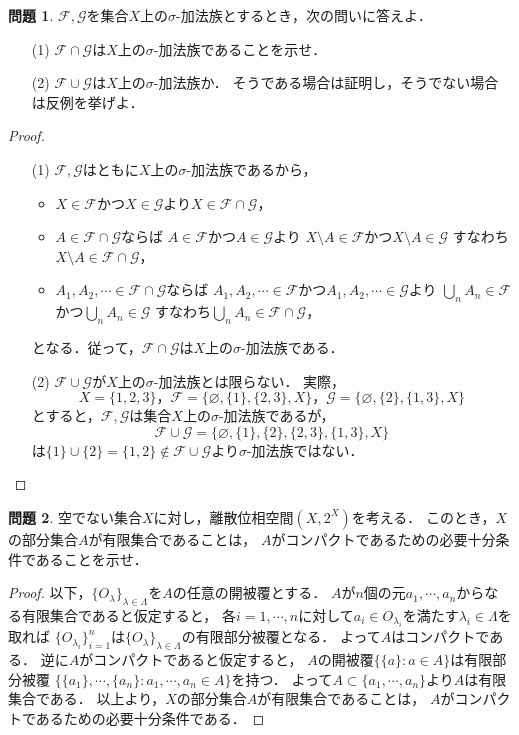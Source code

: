 \documentclass{jsarticle}
\theoremstyle{definition}
\newtheorem{qst}{問題}
\begin{document}
\begin{qst}
$\mathcal{F},\mathcal{G}$を集合$X$上の$\sigma$-加法族とするとき，次の問いに答えよ．
\begin{itemize}
\item[(1)]$\mathcal{F}\cap\mathcal{G}$は$X$上の$\sigma$-加法族であることを示せ．
\item[(2)]$\mathcal{F}\cup\mathcal{G}$は$X$上の$\sigma$-加法族か．
そうである場合は証明し，そうでない場合は反例を挙げよ．
\end{itemize}
\end{qst}
\begin{proof}
\begin{itemize}
\item[(1)]
$\mathcal{F},\mathcal{G}$はともに$X$上の$\sigma$-加法族であるから，
\begin{itemize}
\item$X\in\mathcal{F}$かつ$X\in\mathcal{G}$より$X\in\mathcal{F}\cap\mathcal{G}$，
\item$A\in\mathcal{F}\cap\mathcal{G}$ならば
$A\in\mathcal{F}$かつ$A\in\mathcal{G}$より
$X\setminus A\in\mathcal{F}$かつ$X\setminus A\in\mathcal{G}$
すなわち$X\setminus A\in\mathcal{F}\cap\mathcal{G}$，
\item$A_1,A_2,\cdots\in\mathcal{F}\cap\mathcal{G}$ならば
$A_1,A_2,\cdots\in\mathcal{F}$かつ$A_1,A_2,\cdots\in\mathcal{G}$より
$\bigcup_nA_n\in\mathcal{F}$かつ$\bigcup_nA_n\in\mathcal{G}$
すなわち$\bigcup_nA_n\in\mathcal{F}\cap\mathcal{G}$，
\end{itemize}
となる．従って，$\mathcal{F}\cap\mathcal{G}$は$X$上の$\sigma$-加法族である．
\item[(2)]
$\mathcal{F}\cup\mathcal{G}$が$X$上の$\sigma$-加法族とは限らない．
実際，
\[
X=\{1,2,3\}，
\mathcal{F}=\{\varnothing,\{1\},\{2,3\},X\}，
\mathcal{G}=\{\varnothing,\{2\},\{1,3\},X\}
\]
とすると，$\mathcal{F},\mathcal{G}$は集合$X$上の$\sigma$-加法族であるが，
\[
\mathcal{F}\cup\mathcal{G}=\{\varnothing,\{1\},\{2\},\{2,3\},\{1,3\},X\}
\]
は$\{1\}\cup\{2\}=\{1,2\}\notin\mathcal{F}\cup\mathcal{G}$より$\sigma$-加法族ではない．
\end{itemize}
\end{proof}

\begin{qst}
空でない集合$X$に対し，離散位相空間$(X,2^X)$を考える．
このとき，$X$の部分集合$A$が有限集合であることは，
$A$がコンパクトであるための必要十分条件であることを示せ．
\end{qst}
\begin{proof}
以下，$\{O_\lambda\}_{\lambda\in\Lambda}$を$A$の任意の開被覆とする．
$A$が$n$個の元$a_1,\cdots,a_n$からなる有限集合であると仮定すると，
各$i=1,\cdots,n$に対して$a_i\in O_{\lambda_i}$を満たす$\lambda_i\in\Lambda$を取れば
$\{O_{\lambda_i}\}_{i=1}^n$は$\{O_\lambda\}_{\lambda\in\Lambda}$の有限部分被覆となる．
よって$A$はコンパクトである．
逆に$A$がコンパクトであると仮定すると，
$A$の開被覆$\{\{a\}:a\in A\}$は有限部分被覆
$\{\{a_1\},\cdots,\{a_n\}:a_1,\cdots,a_n\in A\}$を持つ．
よって$A\subset\{a_1,\cdots,a_n\}$より$A$は有限集合である．
以上より，$X$の部分集合$A$が有限集合であることは，
$A$がコンパクトであるための必要十分条件である．
\end{proof}
\end{document}
